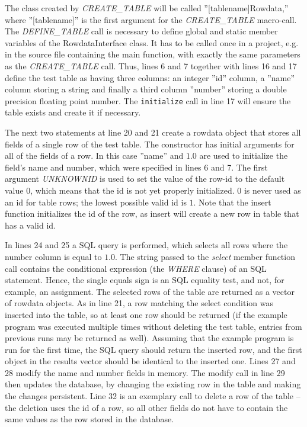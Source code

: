 The class created by \emph{CREATE\_TABLE} will be called ''[tablename]Rowdata,'' where ''[tablename]''
is the first argument for the \emph{CREATE\_TABLE} macro-call.  The \emph{DEFINE\_TABLE} call
is necessary to define global and static member variables of the RowdataInterface class. It has
to be called once in a project, e.g. in the source file containing the main function, with exactly 
the same parameters as the \emph{CREATE\_TABLE} call.
Thus, lines 6 and 7 together with lines 16 and 17 define the test table as having three columns:
an integer ''id'' column, a ''name'' column storing a string and finally a third column ''number''
storing a double precision floating point number. The {\tt initialize} call in line 17
will ensure the table exists and create it if necessary.

The next two statements at line 20 and 21 create a rowdata object that
stores all fields of a single row of the test table. The constructor has
initial arguments for all of the fields of a row. In this case ''name'' and
$1.0$ are used to initialize the field's name and number, which were specified
in lines 6 and 7. The first argument \emph{UNKNOWNID} is used to set the value
of the row-id to the default value $0$, which means that the id is not yet
properly initialized. $0$ is never used as an id for table rows; the lowest 
possible valid id is $1$. Note that the insert function initializes
the id of the row, as insert will create a new row in table that has a valid id.

In lines 24 and 25 a SQL query is performed, which selects all rows where the 
number column is equal to $1.0$. The string passed to the \emph{select} 
member function call contains the conditional expression (the \emph{WHERE}
clause) of an SQL statement. Hence, the single equals sign is an SQL
equality test, and not, for example, an assignment. The selected rows of the table
are returned as a vector of rowdata objects. As in line 21, a row matching 
the select condition was inserted into the table, so at least one row should
be returned (if the example program was executed multiple times without
deleting the test table, entries from previous runs may be returned as well).
Assuming that the example program is run for the first time, the SQL
query should return the inserted row, and the first object in the results vector
should be identical to the inserted one. Lines 27 and 28 modify the name 
and number fields in memory. The modify call in line 29 then updates
the database, by changing the existing row in the table and making the changes
persistent. Line 32 is an exemplary call to delete a row of the table -- the 
deletion uses the id of a row, so all other fields do not have to contain the
same values as the row stored in the database.

